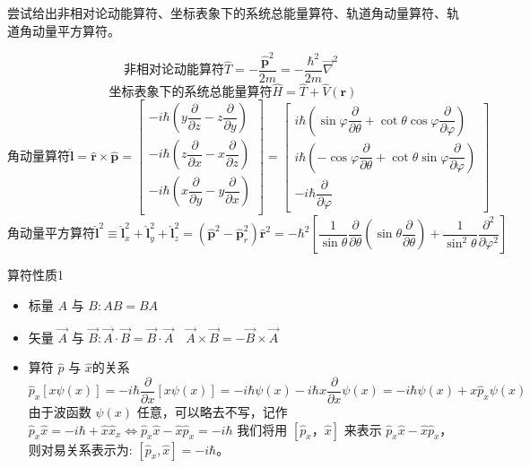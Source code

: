 \begin{example}
尝试给出非相对论动能算符、坐标表象下的系统总能量算符、轨道角动量算符、轨道角动量平方算符。
\soln

	\[
		\text{非相对论动能算符}\hat{T}=-\frac{\boldsymbol{\hat{p}}^2}{2m}=-\frac{\hbar ^2}{2m}\vec{\nabla}^2\,\,   
	\]
	\[
		\text{坐标表象下的系统总能量算符}\hat{H}=\hat{T}+\hat{V}(\boldsymbol{r})
	\]
	\[
	\text{角动量算符}\boldsymbol{\hat{l}}=\boldsymbol{\hat{r}}\times \boldsymbol{\hat{p}}=\left[ \begin{array}{c}
	-i\hbar \left( y\dfrac{\partial}{\partial z}-z\dfrac{\partial}{\partial y} \right)\\
	-i\hbar \left( z\dfrac{\partial}{\partial x}-x\dfrac{\partial}{\partial z} \right)\\
	-i\hbar \left( x\dfrac{\partial}{\partial y}-y\dfrac{\partial}{\partial x} \right)\\
	\end{array} \right] =\left[ \begin{array}{c}
	i\hbar \left( \sin \varphi \dfrac{\partial}{\partial \theta}+\cot \theta \cos \varphi \dfrac{\partial}{\partial \varphi} \right)\\
	i\hbar \left( -\cos \varphi \dfrac{\partial}{\partial \theta}+\cot \theta \sin \varphi \dfrac{\partial}{\partial \varphi} \right)\\
	-i\hbar \dfrac{\partial}{\partial \varphi}
	\end{array} \right] 
	\]
	\[
	\text{角动量平方算符} \boldsymbol{\hat{l}}^2\equiv \boldsymbol{\hat{l}}_{x}^{2}+\boldsymbol{\hat{l}}_{y}^{2}+\boldsymbol{\hat{l}}_{z}^{2}=\left( \boldsymbol{\hat{p}}^2-\boldsymbol{\hat{p}}_{r}^{2} \right) \boldsymbol{\hat{r}}^2=-\hbar ^2\left[ \frac{1}{\sin \theta}\frac{\partial}{\partial \theta}\left( \sin \theta \frac{\partial}{\partial \theta} \right) +\frac{1}{\sin ^2\theta}\frac{\partial ^2}{\partial \varphi ^2} \right] 
	\]
\end{example}
\begin{mydef}{算符性质}{1}
	\begin{itemize}
		\item 标量 $A$ 与 $B: A B=B A$
		\item 矢量 $\vec{A}$ 与 $\vec{B}: \vec{A} \cdot \vec{B}=\vec{B} \cdot \vec{A} \quad \vec{A} \times \vec{B}=-\vec{B} \times \vec{A}$
		\item 算符 $\hat{p}$ 与 $\hat{x}$的关系
		\[
			\hat{p}_x[x \psi(x)]=-i \hbar \frac{\partial}{\partial x}[x \psi(x)]=-i \hbar \psi(x)-i \hbar x \frac{\partial}{\partial x} \psi(x)=-i \hbar \psi(x)+x \hat{p}_x \psi(x)
		\]
		由于波函数 $\psi(x)$ 任意，可以略去不写，记作 $\hat{p}_x \hat{x}=-i \hbar+\hat{x} \hat{x}_x \Leftrightarrow \hat{p}_x \hat{x}-\hat{x} \hat{p}_x=-i \hbar$ 我们将用 $\left[\hat{p}_x，\hat{x}\right]$ 来表示 $\hat{p}_x \hat{x}-\hat{x} \hat{p}_x$，则对易关系表示为: $\left[\hat{p}_x, \hat{x}\right]=-i \hbar$。
	\end{itemize}
\end{mydef}

